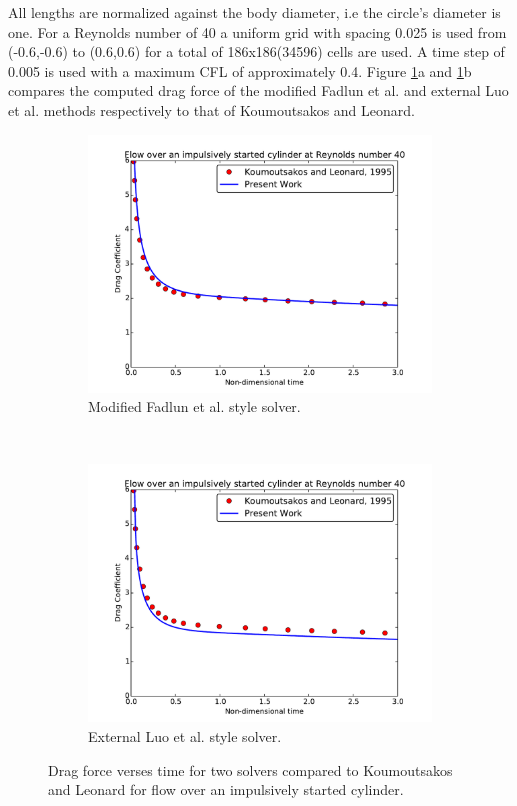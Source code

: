 All lengths are normalized against the body diameter, i.e the circle's diameter is one.
For a Reynolds number of 40 a uniform grid with spacing 0.025 is used from (-0.6,-0.6) to (0.6,0.6) for a total of 186x186(34596) cells are used.
A time step of 0.005 is used with a maximum CFL of approximately 0.4.
Figure \ref{fig:cy40}a and \ref{fig:cy40}b compares the computed drag force of the modified Fadlun et al. and external Luo et al. methods respectively to that of Koumoutsakos and Leonard.
\begin{figure}[!htb]
	\centering
	\begin{subfigure}{0.4\textwidth}
		\includegraphics[width=\linewidth]{cy40fadlun}
		\caption{Modified Fadlun et al. style solver.}
	\end{subfigure}
	~
	\begin{subfigure}{0.4\textwidth}
		\includegraphics[width=\linewidth]{cy40luo}
		\caption{External Luo et al. style solver.}
	\end{subfigure}
	\caption{Drag force verses time for two solvers compared to Koumoutsakos and Leonard for flow over an impulsively started cylinder.}
	\label{fig:cy40}
\end{figure}

